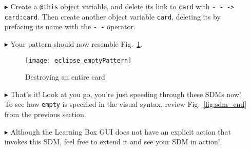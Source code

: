 \begin{itemize}
\item[$\blacktriangleright$] Create a \texttt{@this} object variable, and delete its link to \texttt{card} with \texttt{-~- -> card:card}. Then create another
object variable \texttt{card}, deleting its by prefacing its name with the \texttt{-~-} operator.

\vspace{0.5cm}

\item[$\blacktriangleright$] Your pattern should now resemble Fig.~\ref{fig:emptyPattern}.

\vspace{0.5cm}

\begin{figure}[htpb]
\begin{center}
  \texttt{[image: eclipse\_emptyPattern]}
  \caption{Destroying an entire card}
  \label{fig:emptyPattern}
\end{center}
\end{figure}

\item[$\blacktriangleright$] That's it! Look at you go, you're just speeding through these SDMs now! To see how \texttt{empty} is specified in the visual
syntax, review Fig.~\ref{fig:sdm_end} from the previous section.

\item[$\blacktriangleright$] Although the Learning Box GUI does not have an explicit action that invokes this SDM, feel free to extend it and see your SDM in
action!

\end{itemize}
